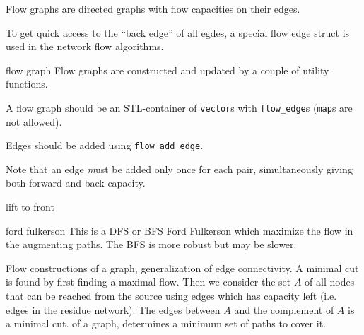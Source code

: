 
Flow graphs are directed graphs with flow capacities on their edges.

To get quick access to the ``back edge'' of all egdes, a special flow edge
struct is used in the network flow algorithms.

\begin{algorithm}{flow graph}
\desc
Flow graphs are constructed and updated by a couple of utility functions.

A flow graph should be an STL-container of {\tt vector}s with
{\tt flow\_edge}s ({\tt map}s are not allowed).

Edges should be added using {\tt flow\_add\_edge}.

Note that an edge {\emph must be} added only once for each pair,
simultaneously giving both forward and back capacity.
\end{algorithm}

\begin{algorithm}{lift to front}
\end{algorithm}

\begin{algorithm}{ford fulkerson}
\desc
This is a DFS or BFS Ford Fulkerson which maximize the flow in the
augmenting paths. The BFS is more robust but may be slower.
\end{algorithm}

\begin{algorithm}{Flow constructions}
 of a graph, generalization of edge connectivity. A
minimal cut is found by first finding a maximal flow. Then we consider the
set $A$ of all nodes that can be reached from the source using edges which
has capacity left (i.e. edges in the residue network). The edges between
$A$ and the complement of $A$ is a minimal cut.
 of a graph, determines a minimum set of paths to
cover it.
\end{algorithm}
